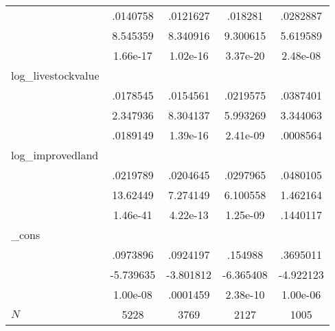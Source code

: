 {\begin{tabular}{l*{4}{c}}
            &    .0140758&    .0121627&     .018281&    .0282887\\
            &    8.545359&    8.340916&    9.300615&    5.619589\\
            &    1.66e-17&    1.02e-16&    3.37e-20&    2.48e-08\\
log\_livestockvalue&            &            &            &            \\
            &    .0178545&    .0154561&    .0219575&    .0387401\\
            &    2.347936&    8.304137&    5.993269&    3.344063\\
            &    .0189149&    1.39e-16&    2.41e-09&    .0008564\\
log\_improvedland&            &            &            &            \\
            &    .0219789&    .0204645&    .0297965&    .0480105\\
            &    13.62449&    7.274149&    6.100558&    1.462164\\
            &    1.46e-41&    4.22e-13&    1.25e-09&    .1440117\\
\_cons      &            &            &            &            \\
            &    .0973896&    .0924197&     .154988&    .3695011\\
            &   -5.739635&   -3.801812&   -6.365408&   -4.922123\\
            &    1.00e-08&    .0001459&    2.38e-10&    1.00e-06\\
\hline
\(N\)       &        5228&        3769&        2127&        1005\\
\hline\hline
\end{tabular}
}
